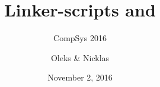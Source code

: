\documentclass[xcolor=table]{beamer}
\title{Linker-scripts and \kudos{}}
\subtitle{CompSys 2016}
\institute{DIKU}
\author{Oleks \& Nicklas}
\date{November 2, 2016}
\begin{document}
\renewcommand*{\arraystretch}{1.2}

\begin{frame} \titlepage \end{frame}






% 
% 
% 
% 
% 
% 
% 
% 
% 
% 
\end{document}
